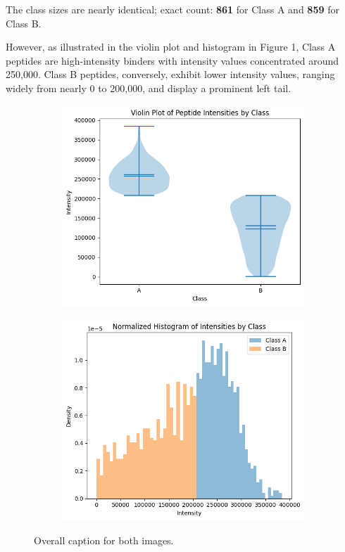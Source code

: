 \documentclass{article}
\begin{document}
The class sizes are nearly identical; exact count: \textbf{861} for Class A and \textbf{859} for Class B.

However, as illustrated in the violin plot and histogram in Figure 1, Class A peptides are high-intensity binders with intensity values concentrated around 250,000. Class B peptides, conversely, exhibit lower intensity values, ranging widely from nearly 0 to 200,000, and display a prominent left tail.

\begin{figure}[h!]
    \centering
    \begin{subfigure}[b]{0.45\textwidth}
        \includegraphics[width=\textwidth]{images/1.png}
        \label{fig:subfig1}
    \end{subfigure}
    \hfill %
    \begin{subfigure}[b]{0.45\textwidth}
        \includegraphics[width=\textwidth]{images/2.png}
        \label{fig:subfig2}
    \end{subfigure}
    \caption{Overall caption for both images.}
    \label{fig:two_images}
\end{figure}
\end{document}
